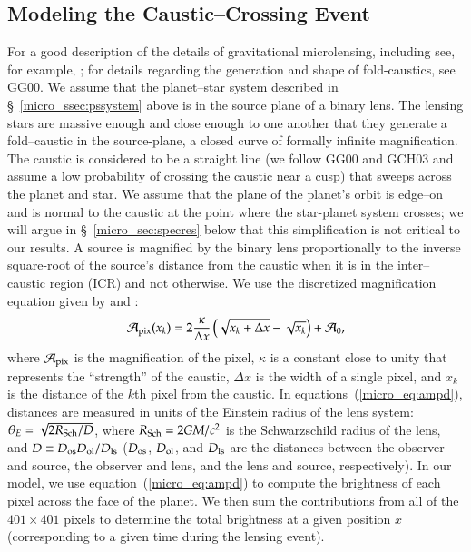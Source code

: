 \subsection{Modeling the Caustic--Crossing Event}
\label{micro_ssec:ccevent}
For a good description of the details of gravitational microlensing,
including see, for example, \citet{mao+paczynski1991}; for details
regarding the generation and shape of fold-caustics, see GG00.  We
assume that the planet--star system described in
\S~\ref{micro_ssec:pssystem} above is in the source plane of a binary lens.
The lensing stars are massive enough and close enough to one another
that they generate a fold--caustic in the source-plane, a closed curve
of formally infinite magnification.  The caustic is considered to be a
straight line (we follow GG00 and GCH03 and assume a low probability
of crossing the caustic near a cusp) that sweeps across the planet and
star.  We assume that the plane of the planet's orbit is edge--on and
is normal to the caustic at the point where the star-planet system
crosses; we will argue in \S~\ref{micro_sec:specres} below that this
simplification is not critical to our results.  A source is magnified
by the binary lens proportionally to the inverse square-root of the
source's distance from the caustic when it is in the inter--caustic
region (ICR) and not otherwise.  We use the discretized magnification
equation given by \citet{lewis+belle1998} and
\citet{ashton+lewis2001}:
%
\begin{equation}
\label{micro_eq:ampd}
\mathcal{A}_{\rm{pix}}(x_k) = 2 \frac{\kappa}{\Delta x} \left(
        \sqrt{x_k + \Delta x} - \sqrt{x_k} \right) + \mathcal{A}_0,
\end{equation}
%
where $\mathcal{A}_{\rm{pix}}$ is the magnification of the pixel,
$\kappa$ is a constant close to unity that represents the ``strength''
of the caustic, $\Delta x$ is the width of a single pixel, and $x_k$
is the distance of the $k$th pixel from the caustic.  In
equations~(\ref{micro_eq:ampd}), distances are measured in units of the
Einstein radius of the lens system: $\theta_E = \sqrt{2
R_{\rm{Sch}}/D}$, where $R_{\rm{Sch}} = 2 G M/c^2$ is the
Schwarzschild radius of the lens, and $D \equiv D_{\rm{os}}
D_{\rm{ol}}/D_{\rm{ls}}$ ($D_{\rm{os}}$, $D_{\rm{ol}}$, and
$D_{\rm{ls}}$ are the distances between the observer and source, the
observer and lens, and the lens and source, respectively).  In our
model, we use equation~(\ref{micro_eq:ampd}) to compute the brightness of
each pixel across the face of the planet.  We then sum the
contributions from all of the $401\times401$ pixels to determine the
total brightness at a given position $x$ (corresponding to a given
time during the lensing event).


